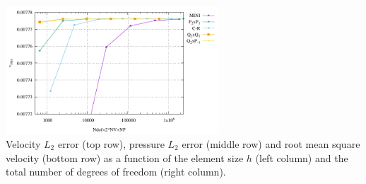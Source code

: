 \begin{center}
\includegraphics[width=8cm]{python_codes/fieldstone_112/results/exp1/vrms_ndof.pdf}\\
{\captionfont Velocity $L_2$ error (top row), pressure $L_2$ error (middle row) and root
mean square velocity (bottom row) as a function of the element size $h$ (left column) 
and the total number of degrees of freedom (right column).}
\end{center}

